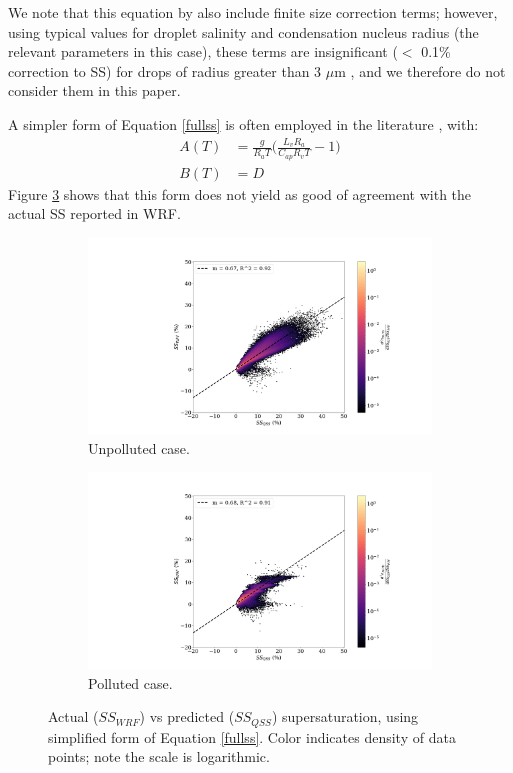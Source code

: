 \documentclass{article}
\begin{document}
We note that this equation by also include finite size correction terms; however, using typical values for droplet salinity and condensation nucleus radius (the relevant parameters in this case), these terms are insignificant ($<$ 0.1\% correction to SS) for drops of radius greater than 3 $\mu$m \cite{Rogers1989}, and we therefore do not consider them in this paper.

A simpler form of Equation \ref{fullss} is often employed in the literature \cite{Grabowski2020, Rogers1989}, with:
\begin{align}
A(T) &= \frac{g}{R_a T}\Big(\frac{L_v R_a}{C_{ap} R_v T} - 1\Big)\nonumber\\
B(T) &= D
\end{align}
Figure \ref{wrfvsqssv2} shows that this form does not yield as good of agreement with the actual SS reported in WRF.

\begin{figure}[ht]
	\centering
	\begin{subfigure}{0.7\textwidth}
		\includegraphics[width=\textwidth]{revmywrf/v2_FINAL_heatmap_ss_qss_vs_ss_wrf_Unpolluted_figure.png}
		\caption{Unpolluted case.}
		\label{wrfvsqssunpollv2}
	\end{subfigure}
	\begin{subfigure}{0.7\textwidth}
		\includegraphics[width=\textwidth]{revmywrf/v2_FINAL_heatmap_ss_qss_vs_ss_wrf_Polluted_figure.png}
		\caption{Polluted case.}
		\label{wrfvsqsspollv2}
	\end{subfigure}
	\caption{Actual ($SS_{WRF}$) vs predicted ($SS_{QSS}$) supersaturation, using simplified form of Equation \ref{fullss}. Color indicates density of data points; note the scale is logarithmic.}
	\label{wrfvsqssv2}
\end{figure}
\end{document}
